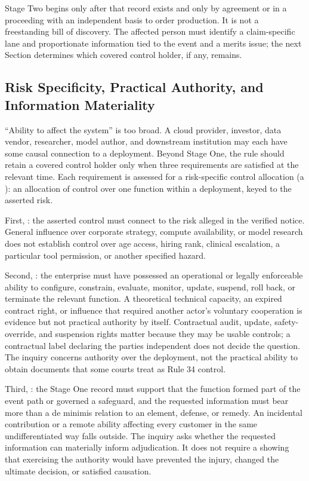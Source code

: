 Stage Two begins only after that record exists and only by agreement or in a proceeding with an independent basis to order production. It is not a freestanding bill of discovery. The affected person must identify a claim-specific lane and proportionate information tied to the event and a merits issue; the next Section determines which covered control holder, if any, remains.

\subsection{Risk Specificity, Practical Authority, and Information Materiality}
\label{sec:material-control}

``Ability to affect the system'' is too broad. A cloud provider, investor, data vendor, researcher, model author, and downstream institution may each have some causal connection to a deployment. Beyond Stage One, the rule should retain a covered control holder only when three requirements are satisfied at the relevant time. Each requirement is assessed for a risk-specific control allocation (a ): an allocation of control over one function within a deployment, keyed to the asserted risk.

First, : the asserted control must connect to the risk alleged in the verified notice. General influence over corporate strategy, compute availability, or model research does not establish control over age access, hiring rank, clinical escalation, a particular tool permission, or another specified hazard.

Second, : the enterprise must have possessed an operational or legally enforceable ability to configure, constrain, evaluate, monitor, update, suspend, roll back, or terminate the relevant function. A theoretical technical capacity, an expired contract right, or influence that required another actor's voluntary cooperation is evidence but not practical authority by itself. Contractual audit, update, safety-override, and suspension rights matter because they may be usable controls; a contractual label declaring the parties independent does not decide the question. The inquiry concerns authority over the deployment, not the practical ability to obtain documents that some courts treat as Rule 34 control.

Third, : the Stage One record must support that the function formed part of the event path or governed a safeguard, and the requested information must bear more than a de minimis relation to an element, defense, or remedy. An incidental contribution or a remote ability affecting every customer in the same undifferentiated way falls outside. The inquiry asks whether the requested information can materially inform adjudication. It does not require a showing that exercising the authority would have prevented the injury, changed the ultimate decision, or satisfied causation.

